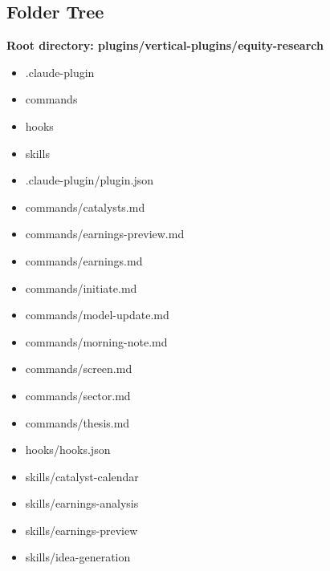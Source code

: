 \documentclass[11pt]{article}
\begin{document}
\subsection{Folder Tree}
\textbf{Root directory: plugins/vertical-plugins/equity-research}
\begin{itemize}[leftmargin=*,itemsep=1pt,topsep=2pt]
\item \hspace*{0.0em}.claude-plugin
\item \hspace*{0.0em}commands
\item \hspace*{0.0em}hooks
\item \hspace*{0.0em}skills
\item \hspace*{0.9em}.claude-plugin/plugin.json
\item \hspace*{0.9em}commands/catalysts.md
\item \hspace*{0.9em}commands/earnings-preview.md
\item \hspace*{0.9em}commands/earnings.md
\item \hspace*{0.9em}commands/initiate.md
\item \hspace*{0.9em}commands/model-update.md
\item \hspace*{0.9em}commands/morning-note.md
\item \hspace*{0.9em}commands/screen.md
\item \hspace*{0.9em}commands/sector.md
\item \hspace*{0.9em}commands/thesis.md
\item \hspace*{0.9em}hooks/hooks.json
\item \hspace*{0.9em}skills/catalyst-calendar
\item \hspace*{0.9em}skills/earnings-analysis
\item \hspace*{0.9em}skills/earnings-preview
\item \hspace*{0.9em}skills/idea-generation

\end{itemize}
\end{document}
